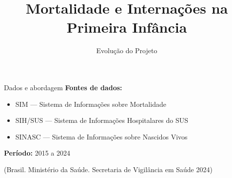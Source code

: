 \documentclass[
  ignorenonframetext,
  brazilian,
]{beamer}
\title{\texorpdfstring{Mortalidade e Internações na Primeira
Infância}{Mortalidade e Internações na Primeira Infância}}
\subtitle{\texorpdfstring{Evolução do Projeto}{Evolução do Projeto}}
\author{}
\date{}
\providecommand{\tightlist}{%
  \setlength{\itemsep}{0pt}\setlength{\parskip}{0pt}}
\begin{document}
\frame{\titlepage}


\begin{frame}{Dados e abordagem}
\protect{}\label{dados-e-abordagem}
\textbf{Fontes de dados:}\\

\begin{itemize}
\tightlist
\item
  SIM --- Sistema de Informações sobre Mortalidade\\
\item
  SIH/SUS --- Sistema de Informações Hospitalares do SUS\\
\item
  SINASC --- Sistema de Informações sobre Nascidos Vivos\\
\end{itemize}

\textbf{Período:} 2015 a 2024

(Brasil. Ministério da Saúde. Secretaria de Vigilância em Saúde 2024)
\end{frame}
\end{document}
